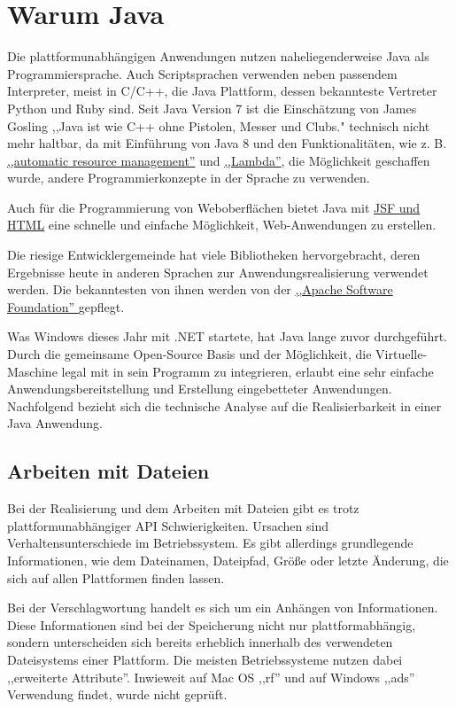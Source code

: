 \documentclass[oneside, ngerman, toc=bibliography,bibliography=totoc,listof=entryprefix, open=right,numbers=noenddot,fontsize=12pt]{scrbook}
\begin{document}
\section{Warum Java}
Die plattformunabhängigen Anwendungen nutzen naheliegenderweise Java als Programmiersprache. Auch Scriptsprachen verwenden neben passendem Interpreter, meist in C/C++, die Java Plattform, dessen bekannteste Vertreter Python und Ruby sind.
Seit Java Version 7 ist die Einschätzung von James Gosling ,,Java ist wie C++ ohne Pistolen, Messer und Clubs." technisch nicht mehr haltbar, da mit Einführung von Java 8 und den Funktionalitäten, wie z. B.  \href{http://www.oracle.com/technetwork/articles/java/trywithresources-401775.html}{,,automatic resource management''} und \href{http://www.oracle.com/technetwork/articles/java/rich-client-lambdas-2227138.html}{,,Lambda''}, die Möglichkeit geschaffen wurde, andere Programmierkonzepte in der Sprache zu verwenden.

Auch für die Programmierung von Weboberflächen bietet Java mit \href{http://www.oracle.com/technetwork/articles/java/enterprise-html5-2227136.html}{JSF und HTML} eine schnelle und einfache Möglichkeit, Web-Anwendungen zu erstellen.

Die riesige Entwicklergemeinde hat viele Bibliotheken hervorgebracht, deren Ergebnisse heute in anderen Sprachen zur Anwendungsrealisierung verwendet werden. Die bekanntesten von ihnen werden von der
\href{http://www.apache.org/}{ ,,Apache Software Foundation'' } gepflegt.


Was Windows dieses Jahr mit {.NET} startete, hat Java lange zuvor durchgeführt. Durch die gemeinsame Open-Source Basis und der Möglichkeit, die Virtuelle-Maschine legal mit in sein Programm zu integrieren, erlaubt eine sehr einfache Anwendungsbereitstellung und Erstellung eingebetteter Anwendungen. Nachfolgend bezieht sich die technische Analyse auf die Realisierbarkeit in einer Java Anwendung.


\subsection{Arbeiten mit Dateien}
Bei der Realisierung und dem Arbeiten mit Dateien gibt es trotz plattformunabhängiger API Schwierigkeiten. Ursachen sind Verhaltensunterschiede im Betriebssystem.
Es gibt allerdings grundlegende Informationen, wie dem Dateinamen, Dateipfad, Größe oder letzte Änderung, die sich auf allen Plattformen finden lassen.

Bei der Verschlagwortung handelt es sich um ein Anhängen von Informationen. Diese Informationen sind bei der Speicherung nicht nur plattformabhängig, sondern unterscheiden sich bereits erheblich innerhalb des verwendeten Dateisystems einer Plattform.
Die meisten Betriebssysteme nutzen dabei ,,erweiterte Attribute''. Inwieweit auf Mac OS ,,\acrshort{rf}'' und auf Windows ,,\acrshort{ads}'' Verwendung findet, wurde nicht geprüft.  
 
\end{document}
